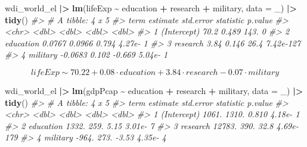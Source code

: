 \documentclass[
  xelatex, ja=standard]{bxjsbook}
\newenvironment{Shaded}{\begin{snugshade}}{\end{snugshade}}
\newcommand{\AttributeTok}[1]{\textcolor[rgb]{0.13,0.29,0.53}{#1}}
\newcommand{\CommentTok}[1]{\textcolor[rgb]{0.56,0.35,0.01}{\textit{#1}}}
\newcommand{\FunctionTok}[1]{\textcolor[rgb]{0.13,0.29,0.53}{\textbf{#1}}}
\newcommand{\NormalTok}[1]{#1}
\newcommand{\SpecialCharTok}[1]{\textcolor[rgb]{0.81,0.36,0.00}{\textbf{#1}}}
\theoremstyle{definition}
\theoremstyle{definition}
\theoremstyle{definition}
\theoremstyle{definition}
\theoremstyle{remark}
\begin{document}
\begin{Shaded}
\begin{Highlighting}[]
\NormalTok{wdi\_world\_el }\SpecialCharTok{|\textgreater{}} \FunctionTok{lm}\NormalTok{(lifeExp }\SpecialCharTok{\textasciitilde{}}\NormalTok{ education }\SpecialCharTok{+}\NormalTok{ research }\SpecialCharTok{+}\NormalTok{ military, }\AttributeTok{data =}\NormalTok{ \_) }\SpecialCharTok{|\textgreater{}} \FunctionTok{tidy}\NormalTok{()}
\CommentTok{\#\textgreater{} \# A tibble: 4 x 5}
\CommentTok{\#\textgreater{}   term        estimate std.error statistic   p.value}
\CommentTok{\#\textgreater{}   \textless{}chr\textgreater{}          \textless{}dbl\textgreater{}     \textless{}dbl\textgreater{}     \textless{}dbl\textgreater{}     \textless{}dbl\textgreater{}}
\CommentTok{\#\textgreater{} 1 (Intercept)  70.2       0.489    143.    0        }
\CommentTok{\#\textgreater{} 2 education     0.0767    0.0966     0.794 4.27e{-}  1}
\CommentTok{\#\textgreater{} 3 research      3.84      0.146     26.4   7.42e{-}127}
\CommentTok{\#\textgreater{} 4 military     {-}0.0683    0.102     {-}0.669 5.04e{-}  1}
\end{Highlighting}
\end{Shaded}

\[lifeExp \sim 70.22 + 0.08\cdot education + 3.84 \cdot research - 0.07 \cdot military\]

\begin{Shaded}
\begin{Highlighting}[]
\NormalTok{wdi\_world\_el }\SpecialCharTok{|\textgreater{}} \FunctionTok{lm}\NormalTok{(gdpPcap }\SpecialCharTok{\textasciitilde{}}\NormalTok{ education }\SpecialCharTok{+}\NormalTok{ research }\SpecialCharTok{+}\NormalTok{ military, }\AttributeTok{data =}\NormalTok{ \_) }\SpecialCharTok{|\textgreater{}} \FunctionTok{tidy}\NormalTok{()}
\CommentTok{\#\textgreater{} \# A tibble: 4 x 5}
\CommentTok{\#\textgreater{}   term        estimate std.error statistic   p.value}
\CommentTok{\#\textgreater{}   \textless{}chr\textgreater{}          \textless{}dbl\textgreater{}     \textless{}dbl\textgreater{}     \textless{}dbl\textgreater{}     \textless{}dbl\textgreater{}}
\CommentTok{\#\textgreater{} 1 (Intercept)    1061.     1310.     0.810 4.18e{-}  1}
\CommentTok{\#\textgreater{} 2 education      1332.      259.     5.15  3.01e{-}  7}
\CommentTok{\#\textgreater{} 3 research      12783.      390.    32.8   4.69e{-}179}
\CommentTok{\#\textgreater{} 4 military       {-}964.      273.    {-}3.53  4.35e{-}  4}
\end{Highlighting}
\end{Shaded}
\end{document}
